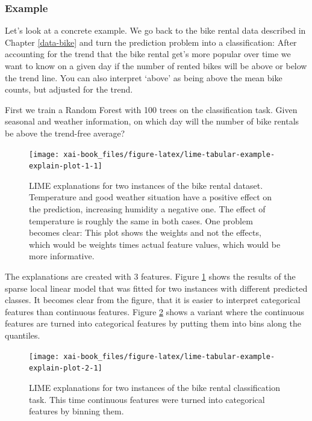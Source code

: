 \documentclass[12pt,]{krantz}
\theoremstyle{definition}
\theoremstyle{definition}
\theoremstyle{definition}
\theoremstyle{remark}
\begin{document}
\subsubsection{Example}\label{example-4}

Let's look at a concrete example. We go back to the bike rental data
described in Chapter \ref{data-bike} and turn the prediction problem
into a classification: After accounting for the trend that the bike
rental get's more popular over time we want to know on a given day if
the number of rented bikes will be above or below the trend line. You
can also interpret `above' as being above the mean bike counts, but
adjusted for the trend.

First we train a Random Forest with 100 trees on the classification
task. Given seasonal and weather information, on which day will the
number of bike rentals be above the trend-free average?

\begin{figure}

{\centering \texttt{[image: xai-book\_files/figure-latex/lime-tabular-example-explain-plot-1-1]} 

}

\caption{LIME explanations for two instances of the bike rental dataset.  Temperature and good weather situation have a positive effect on the prediction, increasing humidity a negative one. The effect of temperature is roughly the same in both cases. One problem becomes clear: This plot shows the weights and not the effects, which would be weights times actual feature values, which would be more informative. }\label{fig:lime-tabular-example-explain-plot-1}
\end{figure}

The explanations are created with 3 features. Figure
\ref{fig:lime-tabular-example-explain-plot-1} shows the results of the
sparse local linear model that was fitted for two instances with
different predicted classes. It becomes clear from the figure, that it
is easier to interpret categorical features than continuous features.
Figure \ref{fig:lime-tabular-example-explain-plot-2} shows a variant
where the continuous features are turned into categorical features by
putting them into bins along the quantiles.

\begin{figure}

{\centering \texttt{[image: xai-book\_files/figure-latex/lime-tabular-example-explain-plot-2-1]} 

}

\caption{LIME explanations for two instances of the bike rental classification task. This time continuous features were turned into categorical features by binning them.}\label{fig:lime-tabular-example-explain-plot-2}
\end{figure}
\end{document}
